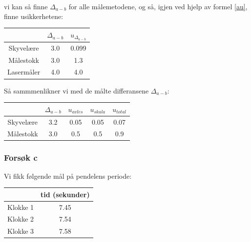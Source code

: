 vi kan så finne $\Delta_{a-b}$ for alle målemetodene, og så, igjen ved hjelp av formel \ref{au}, finne usikkerhetene:

\begin{center}
\begin{tabular}{ | c | c | c |}
    \hline
    & $\Delta_{a-b}$ & $u_{\Delta_{a-b}}$\\
    \hline
     Skyvelære & 3.0 & 0.099\\
    \hline
     Målestokk & 3.0 & 1.3\\
     \hline
     Lasermåler & 4.0 & 4.0\\
     \hline
\end{tabular}
\label{table8}
\end{center}

Så sammmenlikner vi med de målte differansene $\Delta_{a-b}$:

\begin{center}
\begin{tabular}{ | c | c | c | c | c |}
    \hline
    & $\Delta_{a-b}$  & $u_{avles}$ & $u_{skala}$ & $u_{total}$\\
    \hline
     Skyvelære & 3.2  & 0.05  & 0.05 & 0.07\\
    \hline
     Målestokk & 3.0 & 0.5 & 0.5 & 0.9 \\
     \hline
\end{tabular}
\label{table9}
\end{center}

\subsubsection*{Forsøk c}

Vi fikk følgende mål på pendelens periode:

\begin{center}
\begin{tabular}{ | c | c |}
    \hline
    & tid (sekunder)\\
    \hline
    Klokke 1 & 7.45\\
    \hline
    Klokke 2 & 7.54\\
    \hline
    Klokke 3 & 7.58\\
    \hline
\end{tabular}
\end{center}

